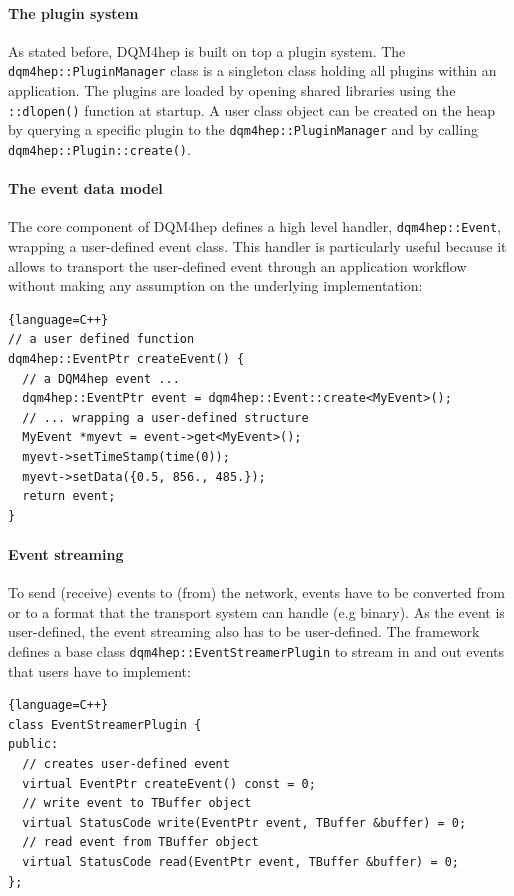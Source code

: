 \documentclass{webofc}
\begin{document}
\paragraph{The plugin system}

As stated before, DQM4hep is built on top a plugin system. 
The \texttt{dqm4hep::PluginManager} class is a singleton class holding all plugins within an application. 
The plugins are loaded by opening shared libraries using the \texttt{::dlopen()} function at startup. 
A user class object can be created on the heap by querying a specific plugin to the \texttt{dqm4hep::PluginManager} and 
by calling \texttt{dqm4hep::Plugin::create()}.

\paragraph{The event data model}

The core component of DQM4hep defines a high level handler, \texttt{dqm4hep::Event}, wrapping a user-defined event class.
This handler is particularly useful because it allows to transport the user-defined event through an application
workflow without making any assumption on the underlying implementation:

\begin{lstlisting}{language=C++}
// a user defined function
dqm4hep::EventPtr createEvent() {
  // a DQM4hep event ...
  dqm4hep::EventPtr event = dqm4hep::Event::create<MyEvent>();
  // ... wrapping a user-defined structure
  MyEvent *myevt = event->get<MyEvent>();
  myevt->setTimeStamp(time(0));
  myevt->setData({0.5, 856., 485.});
  return event;
}
\end{lstlisting}

\paragraph{Event streaming}

To send (receive) events to (from) the network, events have to be converted from or to a format that the transport system can handle (e.g binary). 
As the event is user-defined, the event streaming also has to be user-defined. 
The framework defines a base class \texttt{dqm4hep::EventStreamerPlugin} to stream in and out events that users have to implement:

\begin{lstlisting}{language=C++}
class EventStreamerPlugin {
public:
  // creates user-defined event
  virtual EventPtr createEvent() const = 0;
  // write event to TBuffer object
  virtual StatusCode write(EventPtr event, TBuffer &buffer) = 0;
  // read event from TBuffer object
  virtual StatusCode read(EventPtr event, TBuffer &buffer) = 0;
};
\end{lstlisting}
\end{document}
